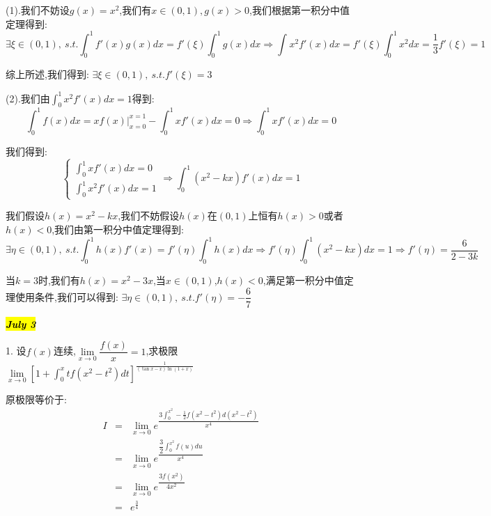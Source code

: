 \begin{solution}
	
	(1).我们不妨设$g(x)=x^2$,我们有$x\in(0,1),g(x)>0$,我们根据第一积分中值定理得到: 
	$$\exists\xi\in(0,1),\ s.t. \int_{0}^{1}f'(x)g(x)dx=f'(\xi)\int_{0}^{1}g(x)dx\Rightarrow \int_{}^{}x^2f'(x)dx=f'(\xi)\int_{0}^{1}x^2dx=\dfrac{1}{3}f'(\xi)=1$$
	
	综上所述,我们得到: $\exists \xi\in(0,1),\ s.t. f'(\xi)=3$
	
	(2).我们由$\int_{0}^{1}x^2f'(x)dx=1$得到: 
	$$\int_{0}^{1}f(x)dx=xf(x)|_{x=0}^{x=1}-\int_{0}^{1}xf'(x)dx=0\Rightarrow \int_{0}^{1}xf'(x)dx=0$$
	
	我们得到: 
	$$\left\lbrace
	\begin{array}{l}
		\int_{0}^{1}xf'(x)dx=0\\
		\int_{0}^{1}x^2f'(x)dx=1
	\end{array}
	\right. \Rightarrow \int_{0}^{1}(x^2-kx)f'(x)dx=1$$
	
	我们假设$h(x)=x^2-kx$,我们不妨假设$h(x)$在$(0,1)$上恒有$h(x)>0$或者$h(x)<0$,我们由第一积分中值定理得到: 
	$$\exists\eta\in(0,1),\ s.t. \int_{0}^{1}h(x)f'(x)=f'(\eta)\int_{0}^{1}h(x)dx\Rightarrow f'(\eta)\int_{0}^{1}(x^2-kx)dx=1\Rightarrow f'(\eta)=\dfrac{6}{2-3k}$$
	
	当$k=3$时,我们有$h(x)=x^2-3x$,当$x\in(0,1)$,$h(x)<0$,满足第一积分中值定理使用条件,我们可以得到: $\exists \eta\in(0,1), \ s.t. f'(\eta)=-\dfrac{6}{7}$
\end{solution}

\hl{\textbf{\textit{July 3}}}

1. 设$f(x)$连续,$\lim\limits_{x\rightarrow 0}\dfrac{f(x)}{x}=1$,求极限$\lim\limits_{x\rightarrow 0 }\left[ 1+\int_{0}^{x}tf(x^2-t^2)dt\right]^{\frac{1}{(\tan x-x)\ln(1+x)}} $
\begin{solution}
	
	原极限等价于: 
	\begin{eqnarray*}
		I&=&\lim\limits_{x\rightarrow 0}e^{\dfrac{3\int_{0}^{x^2}-\frac{1}{2}f(x^2-t^2)d(x^2-t^2)}{x^4}}\\
		&=&\lim\limits_{x\rightarrow 0}e^{\dfrac{\dfrac{3}{2}\int_{0}^{x^2}f(u)du}{x^4}}\\
		&=&\lim\limits_{x\rightarrow 0}e^{\dfrac{3f(x^2)}{4x^2}}\\
		&=&e^{\frac{3}{4}}
	\end{eqnarray*}
\end{solution}

